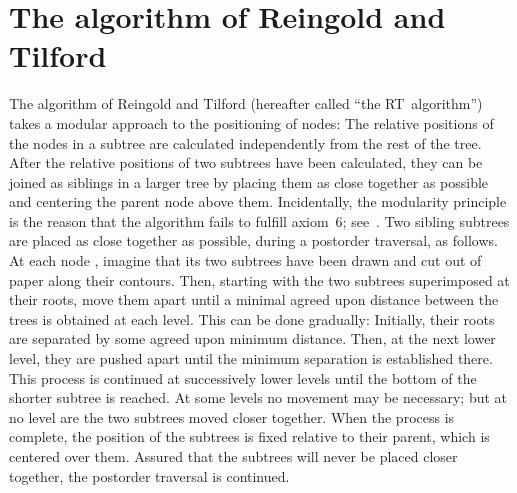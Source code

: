                                                                                 
\section{The algorithm of Reingold and Tilford}                                 
                                                                                
The algorithm of Reingold and Tilford (hereafter called ``the RT~algorithm'')   
takes a modular approach to the                                                 
positioning of nodes: The relative positions of the nodes in a subtree          
are calculated independently from the rest of the tree. After the               
relative positions of two subtrees have been calculated, they can be            
joined as siblings in a larger tree by placing them as close                    
together as possible and centering the parent node above them.                  
Incidentally, the modularity principle is the reason that the                   
algorithm fails to fulfill axiom~6; see~\cite{Complexity}.                      
Two sibling subtrees are placed as close together as possible,                           
during a postorder traversal, as follows. At each node ,                 
imagine that its two subtrees have been drawn and cut out of paper along        
their contours. Then, starting with the two subtrees superimposed at their      
roots, move them apart until a minimal agreed upon distance                     
between the trees is obtained at each level. This can be done gradually:        
Initially, their roots are separated by some agreed upon minimum                
distance. Then, at the next lower level,                                        
they are pushed                                                                 
apart until the minimum separation is established there.                        
This process is continued at successively lower levels until the                
bottom of the shorter subtree is reached. At some levels no movement may be     
necessary; but at no level are the two subtrees moved closer                    
together. When the process is complete, the position of the                     
subtrees is fixed relative to their parent, which is centered over them.        
Assured that the subtrees will never be placed closer together,                 
the postorder traversal is continued.                                           
                                                                                
